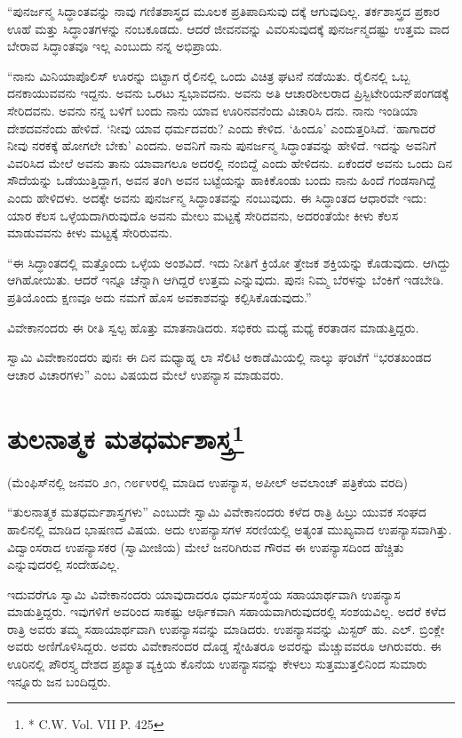 “ಪುನರ್ಜನ್ಮ ಸಿದ್ಧಾಂತವನ್ನು ನಾವು ಗಣಿತಶಾಸ್ತ್ರದ ಮೂಲಕ ಪ್ರತಿಪಾದಿಸುವು ದಕ್ಕೆ ಆಗುವುದಿಲ್ಲ. ತರ್ಕಶಾಸ್ತ್ರದ ಪ್ರಕಾರ ಊಹೆ ಮತ್ತು ಸಿದ್ಧಾಂತಗಳನ್ನು ನಂಬಕೂಡದು. ಆದರೆ ಜೀವನವನ್ನು ವಿವರಿಸುವುದಕ್ಕೆ ಪುನರ್ಜನ್ಮದಷ್ಟು ಉತ್ತಮ ವಾದ ಬೇರಾವ ಸಿದ್ಧಾಂತವೂ ಇಲ್ಲ ಎಂಬುದು ನನ್ನ ಅಭಿಪ್ರಾಯ.

“ನಾನು ಮಿನಿಯಾಪೊಲಿಸ್​ ಊರನ್ನು ಬಿಟ್ಟಾಗ ರೈಲಿನಲ್ಲಿ ಒಂದು ವಿಚಿತ್ರ ಘಟನೆ ನಡೆಯಿತು. ರೈಲಿನಲ್ಲಿ ಒಬ್ಬ ದನಕಾಯುವವನು ಇದ್ದನು. ಅವನು ಒರಟು ಸ್ವಭಾವದನು. ಅವನು ಅತಿ ಆಚಾರಶೀಲರಾದ ಪ್ರಿಸ್ಬಿಟೇರಿಯನ್​ ಪಂಗಡಕ್ಕೆ ಸೇರಿದವನು. ಅವನು ನನ್ನ ಬಳಿಗೆ ಬಂದು ನಾನು ಯಾವ ಊರಿನವನೆಂದು ವಿಚಾರಿಸಿ ದನು. ನಾನು ಇಂಡಿಯಾ ದೇಶದವನೆಂದು ಹೇಳಿದೆ. ‘ನೀವು ಯಾವ ಧರ್ಮದವರು? ಎಂದು ಕೇಳಿದ. ‘ಹಿಂದೂ’ ಎಂದುತ್ತರಿಸಿದೆ. ‘ಹಾಗಾದರೆ ನೀವು ನರಕಕ್ಕೆ ಹೋಗಲೇ ಬೇಕು’ ಎಂದನು. ಅವನಿಗೆ ನಾನು ಪುನರ್ಜನ್ಮ ಸಿದ್ಧಾಂತವನ್ನು ಹೇಳಿದೆ. ಇದನ್ನು ಅವನಿಗೆ ವಿವರಿಸಿದ ಮೇಲೆ ಅವನು ತಾನು ಯಾವಾಗಲೂ ಅದರಲ್ಲಿ ನಂಬಿದ್ದೆ ಎಂದು ಹೇಳಿದನು. ಏಕೆಂದರೆ ಅವನು ಒಂದು ದಿನ ಸೌದೆಯನ್ನು ಒಡೆಯುತ್ತಿದ್ದಾಗ, ಅವನ ತಂಗಿ ಅವನ ಬಟ್ಟೆಯನ್ನು ಹಾಕಿಕೊಂಡು ಬಂದು ನಾನು ಹಿಂದೆ ಗಂಡಸಾಗಿದ್ದೆ ಎಂದು ಹೇಳಿದಳು. ಅದಕ್ಕೇ ಅವನು ಪುನರ್ಜನ್ಮ ಸಿದ್ಧಾಂತವನ್ನು ನಂಬುವುದು. ಈ ಸಿದ್ಧಾಂತದ ಆಧಾರವೇ ಇದು: ಯಾರ ಕೆಲಸ ಒಳ್ಳೆಯದಾಗಿರುವುದೊ ಅವನು ಮೇಲು ಮಟ್ಟಕ್ಕೆ ಸೇರಿದವನು, ಅದರಂತೆಯೇ ಕೀಳು ಕೆಲಸ ಮಾಡುವವನು ಕೀಳು ಮಟ್ಟಕ್ಕೆ ಸೇರಿರುವನು.

“ಈ ಸಿದ್ಧಾಂತದಲ್ಲಿ ಮತ್ತೊಂದು ಒಳ್ಳೆಯ ಅಂಶವಿದೆ. ಇದು ನೀತಿಗೆ ಕ್ರಿಯೋ ತ್ತೇಜಕ ಶಕ್ತಿಯನ್ನು ಕೊಡುವುದು. ಆಗಿದ್ದು ಆಗಿಹೋಯಿತು. ಆದರೆ ಇನ್ನೂ ಚೆನ್ನಾಗಿ ಆಗಿದ್ದರೆ ಉತ್ತಮ ಎನ್ನುವುದು. ಪುನಃ ನಿಮ್ಮ ಬೆರಳನ್ನು ಬೆಂಕಿಗೆ ಇಡಬೇಡಿ. ಪ್ರತಿಯೊಂದು ಕ್ಷಣವೂ ಅದು ನಮಗೆ ಹೊಸ ಅವಕಾಶವನ್ನು ಕಲ್ಪಿಸಿಕೊಡುವುದು.”

ವಿವೇಕಾನಂದರು ಈ ರೀತಿ ಸ್ವಲ್ಪ ಹೊತ್ತು ಮಾತನಾಡಿದರು. ಸಭಿಕರು ಮಧ್ಯೆ ಮಧ್ಯೆ ಕರತಾಡನ ಮಾಡುತ್ತಿದ್ದರು.

ಸ್ವಾಮಿ ವಿವೇಕಾನಂದರು ಪುನಃ ಈ ದಿನ ಮಧ್ಯಾಹ್ನ ಲಾ ಸೆಲಿಟಿ ಅಕಾಡೆಮಿಯಲ್ಲಿ ನಾಲ್ಕು ಘಂಟೆಗೆ “ಭರತಖಂಡದ ಆಚಾರ ವಿಚಾರಗಳು” ಎಂಬ ವಿಷಯದ ಮೇಲೆ ಉಪನ್ಯಾಸ ಮಾಡುವರು.


\section{ತುಲನಾತ್ಮಕ ಮತಧರ್ಮಶಾಸ್ತ್ರ\protect\footnote{* C.W. Vol. VII P. 425}}

\begin{center}
(ಮೆಂಫಿಸ್​ನಲ್ಲಿ ಜನವರಿ ೨೧, ೧೮೯೪ರಲ್ಲಿ ಮಾಡಿದ ಉಪನ್ಯಾಸ, ಅಪೀಲ್​ ಅವಲಾಂಚ್​ ಪತ್ರಿಕೆಯ ವರದಿ)
\end{center}

“ತುಲನಾತ್ಮಕ ಮತಧರ್ಮಶಾಸ್ತ್ರಗಳು” ಎಂಬುದೇ ಸ್ವಾಮಿ ವಿವೇಕಾನಂದರು ಕಳೆದ ರಾತ್ರಿ ಹಿಬ್ರು ಯುವಕ ಸಂಘದ ಹಾಲಿನಲ್ಲಿ ಮಾಡಿದ ಭಾಷಣದ ವಿಷಯ. ಅದು ಉಪನ್ಯಾಸಗಳ ಸರಣಿಯಲ್ಲಿ ಅತ್ಯಂತ ಮುಖ್ಯವಾದ ಉಪನ್ಯಾಸವಾಗಿತ್ತು. ವಿದ್ವಾಂಸರಾದ ಉಪನ್ಯಾಸಕರ (ಸ್ವಾಮೀಜಿಯ) ಮೇಲೆ ಜನರಿಗಿರುವ ಗೌರವ ಈ ಉಪನ್ಯಾಸದಿಂದ ಹೆಚ್ಚಿತು ಎನ್ನುವುದರಲ್ಲಿ ಸಂದೇಹವಿಲ್ಲ.

ಇದುವರೆಗೂ ಸ್ವಾಮಿ ವಿವೇಕಾನಂದರು ಯಾವುದಾದರೂ ಧರ್ಮಸಂಸ್ಥೆಯ ಸಹಾಯಾರ್ಥವಾಗಿ ಉಪನ್ಯಾಸ ಮಾಡುತ್ತಿದ್ದರು. ಇವುಗಳಿಗೆ ಅವರಿಂದ ಸಾಕಷ್ಟು ಆರ್ಥಿಕವಾಗಿ ಸಹಾಯವಾಗಿರುವುದರಲ್ಲಿ ಸಂಶಯವಿಲ್ಲ. ಅದರೆ ಕಳೆದ ರಾತ್ರಿ ಅವರು ತಮ್ಮ ಸಹಾಯಾರ್ಥವಾಗಿ ಉಪನ್ಯಾಸವನ್ನು ಮಾಡಿದರು. ಉಪನ್ಯಾಸವನ್ನು ಮಿಸ್ಟರ್​ ಹು. ಎಲ್​. ಬ್ರಿಂಕ್ಲೇ ಅವರು ಅಣಿಗೊಳಿಸಿದ್ದರು. ಅವರು ವಿವೇಕಾನಂದರ ದೊಡ್ಡ ಸ್ನೇಹಿತರೂ ಅವರನ್ನು ಮೆಚ್ಚುವವರೂ ಆಗಿರುವರು. ಈ ಊರಿನಲ್ಲಿ ಪೌರಸ್ತ್ಯ ದೇಶದ ಪ್ರಖ್ಯಾತ ವ್ಯಕ್ತಿಯ ಕೊನೆಯ ಉಪನ್ಯಾಸವನ್ನು ಕೇಳಲು ಸುತ್ತಮುತ್ತಲಿನಿಂದ ಸುಮಾರು ಇನ್ನೂರು ಜನ ಬಂದಿದ್ದರು.


